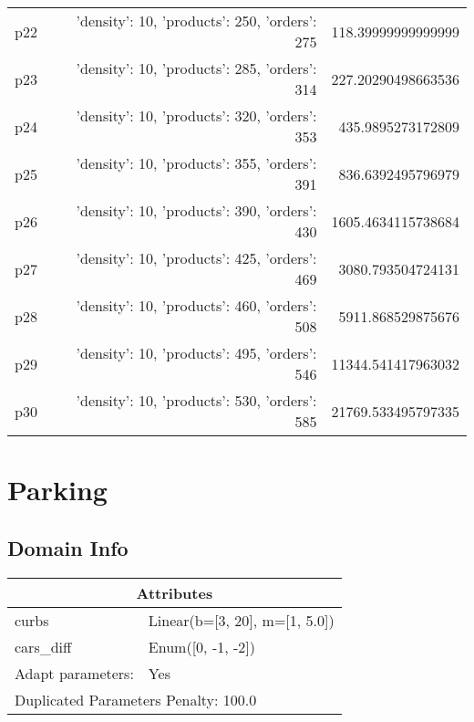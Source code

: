 \documentclass{article}
\begin{document}
\begin{center}
\begin{tabular}{r|r|r}
  p22&{'density': 10, 'products': 250, 'orders': 275}&118.39999999999999\\
  p23&{'density': 10, 'products': 285, 'orders': 314}&227.20290498663536\\
  p24&{'density': 10, 'products': 320, 'orders': 353}&435.9895273172809\\
  p25&{'density': 10, 'products': 355, 'orders': 391}&836.6392495796979\\
  p26&{'density': 10, 'products': 390, 'orders': 430}&1605.4634115738684\\
  p27&{'density': 10, 'products': 425, 'orders': 469}&3080.793504724131\\
  p28&{'density': 10, 'products': 460, 'orders': 508}&5911.868529875676\\
  p29&{'density': 10, 'products': 495, 'orders': 546}&11344.541417963032\\
  p30&{'density': 10, 'products': 530, 'orders': 585}&21769.533495797335
                            \end{tabular}
                            \end{center}
                    
                            \newpage \section{Parking}
                    \subsection*{Domain Info}

                    \begin{center}
                    \begin{tabular}{p{}p{}}
                    \multicolumn{2}{c}{\bf \large Attributes}\\\midrule
                    curbs & Linear(b=[3, 20], m=[1, 5.0])\\
cars\_diff & Enum([0, -1, -2])
                    
                    \\\midrule
                    Adapt parameters: & Yes
                
                     \\\midrule
                    \multicolumn{2}{l}{Duplicated Parameters Penalty: 100.0}
                    \end{tabular}
                    \end{center}
                
\end{document}
